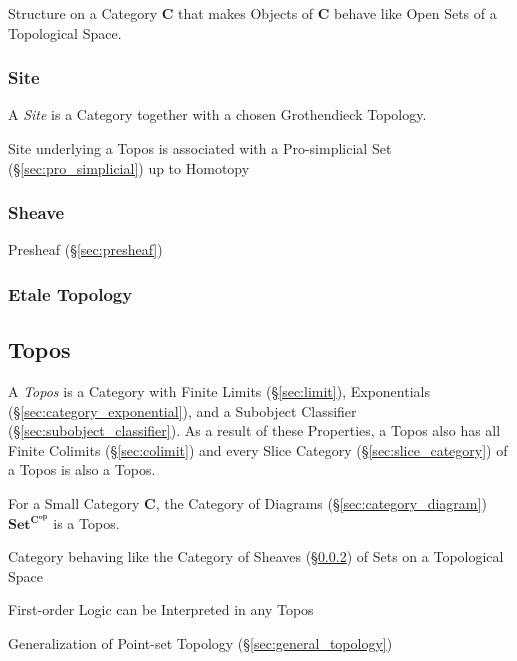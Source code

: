 Structure on a Category $\mathbf{C}$ that makes Objects of
$\mathbf{C}$ behave like Open Sets of a Topological Space.



\subsubsection{Site}\label{sec:site}

A \emph{Site} is a Category together with a chosen Grothendieck
Topology.

Site underlying a Topos is associated with a Pro-simplicial Set
(\S\ref{sec:pro_simplicial}) up to Homotopy



\subsubsection{Sheave}\label{sec:sheave}

Presheaf (\S\ref{sec:presheaf})



\subsubsection{Etale Topology}\label{sec:etale_topology}



\subsection{Topos}\label{sec:topos}

A \emph{Topos} is a Category with Finite Limits (\S\ref{sec:limit}),
Exponentials (\S\ref{sec:category_exponential}), and a Subobject
Classifier (\S\ref{sec:subobject_classifier}). As a result of these
Properties, a Topos also has all Finite Colimits (\S\ref{sec:colimit})
and every Slice Category (\S\ref{sec:slice_category}) of a Topos is
also a Topos.

For a Small Category $\mathbf{C}$, the Category of Diagrams
(\S\ref{sec:category_diagram}) $\mathbf{Set^{C^{op}}}$ is a
Topos.\cite{awodey06}

Category behaving like the Category of Sheaves (\S\ref{sec:sheave})
of Sets on a Topological Space

First-order Logic can be Interpreted in any Topos

Generalization of Point-set Topology (\S\ref{sec:general_topology})



